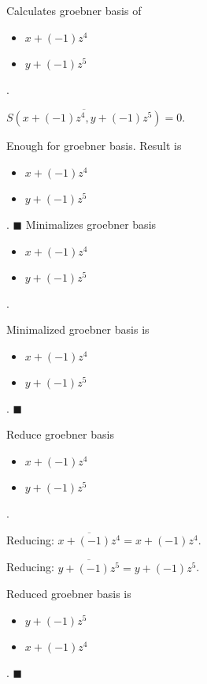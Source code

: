 Calculates groebner basis of 
\begin{itemize}
\item $x+(-1)z^{4}$
\item $y+(-1)z^{5}$
\end{itemize}  .


$\overline{S(x+(-1)z^{4}, y+(-1)z^{5})} = 0$.

Enough for groebner basis.  Result is \begin{itemize}
\item $x+(-1)z^{4}$
\item $y+(-1)z^{5}$
\end{itemize}  .
$\blacksquare{}$
Minimalizes groebner basis
\begin{itemize}
\item $x+(-1)z^{4}$
\item $y+(-1)z^{5}$
\end{itemize}  .


Minimalized groebner basis is
\begin{itemize}
\item $x+(-1)z^{4}$
\item $y+(-1)z^{5}$
\end{itemize}  .
$\blacksquare{}$

Reduce groebner basis
\begin{itemize}
\item $x+(-1)z^{4}$
\item $y+(-1)z^{5}$
\end{itemize}  .


Reducing: $\overline{x+(-1)z^{4}} = x+(-1)z^{4}$.

Reducing: $\overline{y+(-1)z^{5}} = y+(-1)z^{5}$.

Reduced groebner basis is
\begin{itemize}
\item $y+(-1)z^{5}$
\item $x+(-1)z^{4}$
\end{itemize}  .
$\blacksquare{}$
